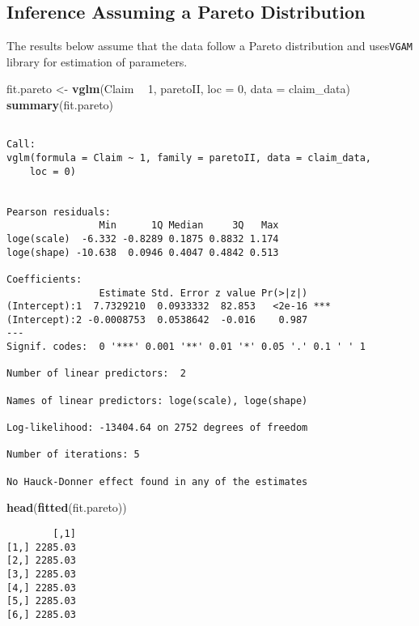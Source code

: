 \documentclass[]{book}
\newenvironment{Shaded}{\begin{snugshade}}{\end{snugshade}}
\newcommand{\KeywordTok}[1]{\textcolor[rgb]{0.13,0.29,0.53}{\textbf{#1}}}
\newcommand{\DataTypeTok}[1]{\textcolor[rgb]{0.13,0.29,0.53}{#1}}
\newcommand{\DecValTok}[1]{\textcolor[rgb]{0.00,0.00,0.81}{#1}}
\newcommand{\StringTok}[1]{\textcolor[rgb]{0.31,0.60,0.02}{#1}}
\newcommand{\OperatorTok}[1]{\textcolor[rgb]{0.81,0.36,0.00}{\textbf{#1}}}
\newcommand{\NormalTok}[1]{#1}
\theoremstyle{definition}
\theoremstyle{definition}
\theoremstyle{definition}
\theoremstyle{remark}
\begin{document}
\subsection{Inference Assuming a Pareto
Distribution}\label{inference-assuming-a-pareto-distribution}

The results below assume that the data follow a Pareto distribution and
uses\texttt{VGAM} library for estimation of parameters.

\begin{Shaded}
\begin{Highlighting}[]
\NormalTok{fit.pareto <-}\StringTok{ }\KeywordTok{vglm}\NormalTok{(Claim }\OperatorTok{~}\StringTok{ }\DecValTok{1}\NormalTok{, paretoII, }\DataTypeTok{loc =} \DecValTok{0}\NormalTok{, }\DataTypeTok{data =}\NormalTok{ claim_data)}
\KeywordTok{summary}\NormalTok{(fit.pareto)}
\end{Highlighting}
\end{Shaded}

\begin{verbatim}

Call:
vglm(formula = Claim ~ 1, family = paretoII, data = claim_data, 
    loc = 0)


Pearson residuals:
                Min      1Q Median     3Q   Max
loge(scale)  -6.332 -0.8289 0.1875 0.8832 1.174
loge(shape) -10.638  0.0946 0.4047 0.4842 0.513

Coefficients: 
                Estimate Std. Error z value Pr(>|z|)    
(Intercept):1  7.7329210  0.0933332  82.853   <2e-16 ***
(Intercept):2 -0.0008753  0.0538642  -0.016    0.987    
---
Signif. codes:  0 '***' 0.001 '**' 0.01 '*' 0.05 '.' 0.1 ' ' 1

Number of linear predictors:  2 

Names of linear predictors: loge(scale), loge(shape)

Log-likelihood: -13404.64 on 2752 degrees of freedom

Number of iterations: 5 

No Hauck-Donner effect found in any of the estimates
\end{verbatim}

\begin{Shaded}
\begin{Highlighting}[]
\KeywordTok{head}\NormalTok{(}\KeywordTok{fitted}\NormalTok{(fit.pareto))}
\end{Highlighting}
\end{Shaded}

\begin{verbatim}
        [,1]
[1,] 2285.03
[2,] 2285.03
[3,] 2285.03
[4,] 2285.03
[5,] 2285.03
[6,] 2285.03
\end{verbatim}
\end{document}
